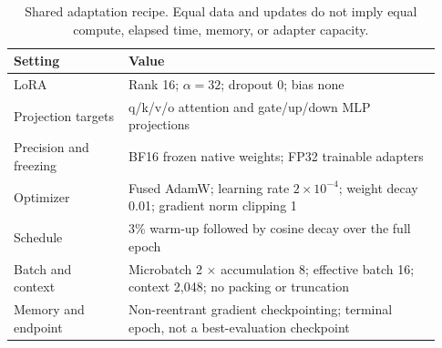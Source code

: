 \documentclass[10pt,letterpaper]{article}
\begin{document}
\begin{table}[htbp]
\centering
\small
\caption{Shared adaptation recipe. Equal data and updates do not imply equal
compute, elapsed time, memory, or adapter capacity.}
\label{tab:recipe}
\begin{tabular}{@{}p{0.25\linewidth}p{0.68\linewidth}@{}}
\toprule
Setting & Value\\
\midrule
LoRA & Rank 16; $\alpha=32$; dropout 0; bias none\\
Projection targets & q/k/v/o attention and gate/up/down MLP projections\\
Precision and freezing & BF16 frozen native weights; FP32 trainable adapters\\
Optimizer & Fused AdamW; learning rate $2\times10^{-4}$;
weight decay 0.01; gradient norm clipping 1\\
Schedule & 3\% warm-up followed by cosine decay over the full epoch\\
Batch and context & Microbatch 2 $\times$ accumulation 8; effective batch 16;
context 2,048; no packing or truncation\\
Memory and endpoint & Non-reentrant gradient checkpointing; terminal epoch,
not a best-evaluation checkpoint\\
\bottomrule
\end{tabular}
\end{table}
\end{document}
